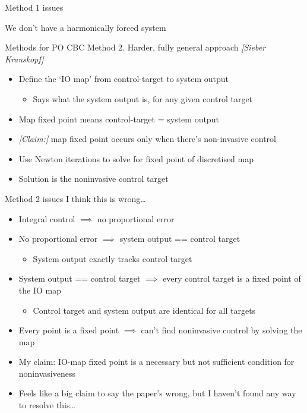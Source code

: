 \documentclass[presentation]{beamer}
\begin{document}
\begin{frame}[label={sec:org04ebd72}]{Method 1 issues}
\begin{center}
We don't have a harmonically forced system
\end{center}
\end{frame}

\begin{frame}[<+->][label={sec:org607e53f}]{Methods for PO CBC}
Method 2. Harder, fully general approach \emph{[Sieber Krauskopf]}
\vfill
\begin{itemize}
\item Define the `IO map' from control-target to system output
\begin{itemize}
\item Says what the system output is, for any given control target
\end{itemize}
\item Map fixed point means control-target = system output
\item \emph{[Claim:]} map fixed point occurs only when there's non-invasive control
\item Use Newton iterations to solve for fixed point of discretised map
\item Solution is the noninvasive control target
\end{itemize}
\end{frame}

\begin{frame}[<+->][label={sec:orgf7c1125}]{Method 2 issues}
I think this is wrong\ldots{}
\begin{itemize}
\item Integral control \(\implies\) no proportional error
\item No proportional error \(\implies\) system output == control target
\begin{itemize}
\item System output exactly tracks control target
\end{itemize}
\item System output == control target \(\implies\) every control target is a fixed point of the IO map
\begin{itemize}
\item Control target and system output are identical for all targets
\end{itemize}
\item Every point is a fixed point \(\implies\) can't find noninvasive control by solving the map
\item My claim: IO-map fixed point is a necessary but not sufficient condition for noninvasiveness
\item Feels like a big claim to say the paper's wrong, but I haven't found any way to resolve this\ldots{}
\end{itemize}
\end{frame}
\end{document}
